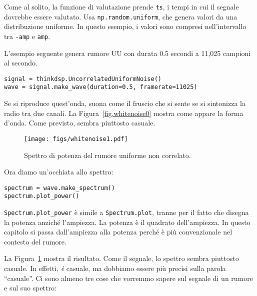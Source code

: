 \documentclass[12pt]{book} \usepackage[width=5.5in,height=8.5in, hmarginratio=3:2,vmarginratio=1:1]{geometry}
\begin{document}
Come al solito, la funzione di valutazione prende {\tt ts}, i tempi in cui il segnale dovrebbe essere valutato. Usa {\tt np.random.uniform}, che genera valori da una distribuzione uniforme. In questo esempio, i valori sono compresi nell'intervallo tra {\tt -amp} e {\tt amp}.

L'esempio seguente genera rumore UU con durata 0.5 secondi a 11,025 campioni al secondo.

\begin{verbatim} 
signal = thinkdsp.UncorrelatedUniformNoise()
wave = signal.make_wave(duration=0.5, framerate=11025)
 \end{verbatim} 

Se si riproduce quest'onda, suona come il fruscio che si sente se si sintonizza la radio tra due canali. La Figura~\ref{fig.whitenoise0} mostra come appare la forma d'onda. Come previsto, sembra piuttosto casuale.

\begin{figure} 

\centerline{\texttt{[image: figs/whitenoise1.pdf]}} \caption{Spettro di potenza del rumore uniforme non correlato.} \label{fig.whitenoise1} \end{figure} 

Ora diamo un'occhiata allo spettro:

\begin{verbatim} 
spectrum = wave.make_spectrum()
spectrum.plot_power()
 \end{verbatim} 

\verb"Spectrum.plot_power" è simile a \verb"Spectrum.plot", tranne per il fatto che disegna la potenza anziché l'ampiezza. La potenza è il quadrato dell'ampiezza. In questo capitolo si passa dall'ampiezza alla potenza perché è più convenzionale nel contesto del rumore.

La Figura~\ref{fig.whitenoise1} mostra il risultato. Come il segnale, lo spettro sembra piuttosto casuale. In effetti, {\em è} casuale, ma dobbiamo essere più precisi sulla parola ``casuale''. Ci sono almeno tre cose che vorremmo sapere sul segnale di un rumore e sul suo spettro:
\end{document}
